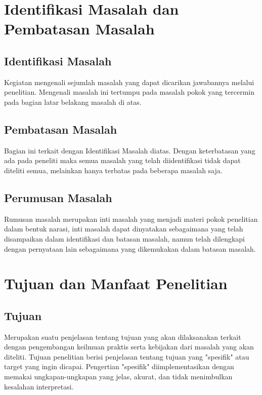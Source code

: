 \section{Identifikasi Masalah dan Pembatasan Masalah}

\subsection{Identifikasi Masalah}
\begin{subsectioncontent}
    \hspace{\parindent}Kegiatan mengenali sejumlah masalah yang dapat dicarikan jawabannya melalui penelitian. Mengenali masalah ini tertumpu pada masalah pokok yang tercermin pada bagian latar belakang masalah di atas.
\end{subsectioncontent}

\subsection{Pembatasan Masalah}
\begin{subsectioncontent}
    \hspace{\parindent}Bagian ini terkait dengan Identifikasi Masalah diatas. Dengan keterbatasan yang ada pada peneliti maka semua masalah yang telah diidentifikasi tidak dapat diteliti semua, melainkan hanya terbatas pada beberapa masalah saja.
\end{subsectioncontent}

\subsection{Perumusan Masalah}
\begin{subsectioncontent}
    \hspace{\parindent}Rumusan masalah merupakan inti masalah yang menjadi materi pokok penelitian dalam bentuk narasi, inti masalah dapat dinyatakan sebagaimana yang telah disampaikan dalam identifikasi dan batasan masalah, namun telah dilengkapi dengan pernyataan lain sebagaimana yang dikemukakan dalam  batasan masalah.
\end{subsectioncontent}

\section{Tujuan dan Manfaat Penelitian}

\subsection{Tujuan}
\begin{subsectioncontent}
    \hspace{\parindent}Merupakan suatu penjelasan tentang tujuan yang akan dilaksanakan terkait dengan pengembangan keilmuan praktis serta kebijakan dari masalah yang akan diteliti. Tujuan penelitian berisi penjelasan tentang tujuan yang "spesifik" atau target yang ingin dicapai. Pengertian "spesifik" diimplementasikan dengan memakai ungkapan-ungkapan yang jelas, akurat, dan tidak menimbulkan kesalahan interpretasi.
\end{subsectioncontent}


